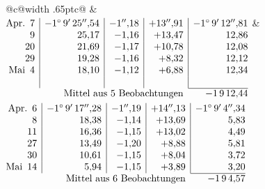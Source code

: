 \noindent\begin{tabular}{@{}c@{\hspace{.4em}\vrule width .65pt\hspace{.4em}}c@{}}
 &
 \\[.18ex]
\(\begin{array}[t]{@{}r|r|r|r|r@{}}
\text{Apr.}\enspace 7 & -1^\circ\,9'\,25''{,}54 & -1''{,}18 & +13''{,}91 & -1^\circ\,9'\,12''{,}81\\
9 & 25{,}17 & -1{,}16 & +13{,}47 & 12{,}86\\
20 & 21{,}69 & -1{,}17 & +10{,}78 & 12{,}08\\
29 & 19{,}28 & -1{,}16 & +8{,}32 & 12{,}12\\
\text{Mai}\enspace 4 & 18{,}10 & -1{,}12 & +6{,}88 & 12{,}34\\
 & & & & \\
\cline{5-5}
\multicolumn{4}{r}{\text{Mittel aus 5 Beobachtungen}} & -1\,9\,12{,}44
\end{array}\)
&
\(\begin{array}[t]{@{}r|r|r|r|r@{}}
\text{Apr.}\enspace 6 & -1^\circ\,9'\,17''{,}28 & -1''{,}19 & +14''{,}13 & -1^\circ\,9'\,4''{,}34\\
8 & 18{,}38 & -1{,}14 & +13{,}69 & 5{,}83\\
11 & 16{,}36 & -1{,}15 & +13{,}02 & 4{,}49\\
27 & 13{,}49 & -1{,}20 & +8{,}88 & 5{,}81\\
30 & 10{,}61 & -1{,}15 & +8{,}04 & 3{,}72\\
\text{Mai}\enspace 14 & 5{,}94 & -1{,}15 & +3{,}89 & 3{,}20\\
\cline{5-5}
\multicolumn{4}{r}{\text{Mittel aus 6 Beobachtungen}} & -1\,9\,4{,}57
\end{array}\)
\end{tabular}\par\medskip
